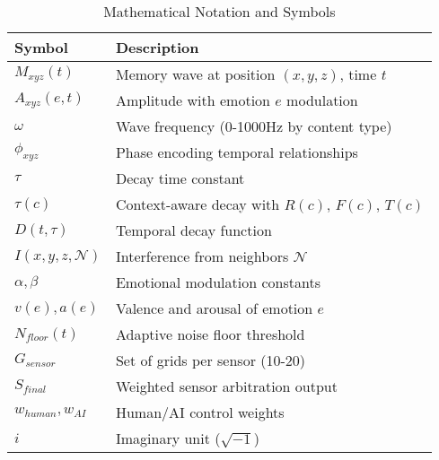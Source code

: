 \documentclass[11pt,letterpaper]{article}
\begin{document}
\begin{table}[h]
\centering
\caption{Mathematical Notation and Symbols}
\label{tab:symbols}
\footnotesize
\begin{tabular}{@{}ll@{}}
\toprule
\textbf{Symbol} & \textbf{Description} \\
\midrule
$M_{xyz}(t)$ & Memory wave at position $(x,y,z)$, time $t$ \\
$A_{xyz}(e,t)$ & Amplitude with emotion $e$ modulation \\
$\omega$ & Wave frequency (0-1000Hz by content type) \\
$\phi_{xyz}$ & Phase encoding temporal relationships \\
$\tau$ & Decay time constant \\
$\tau(c)$ & Context-aware decay with $R(c)$, $F(c)$, $T(c)$ \\
$D(t,\tau)$ & Temporal decay function \\
$I(x,y,z,\mathcal{N})$ & Interference from neighbors $\mathcal{N}$ \\
$\alpha, \beta$ & Emotional modulation constants \\
$v(e), a(e)$ & Valence and arousal of emotion $e$ \\
$N_{floor}(t)$ & Adaptive noise floor threshold \\
$G_{sensor}$ & Set of grids per sensor (10-20) \\
$S_{final}$ & Weighted sensor arbitration output \\
$w_{human}, w_{AI}$ & Human/AI control weights \\
$i$ & Imaginary unit ($\sqrt{-1}$) \\
\bottomrule
\end{tabular}
\end{table}
\end{document}
